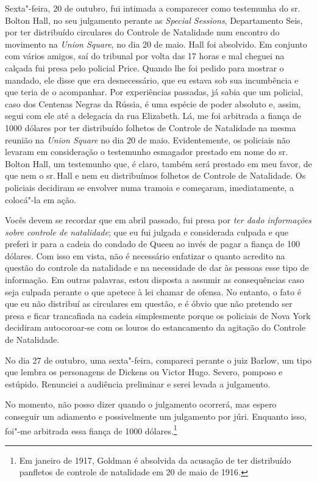 Sexta"-feira, 20 de outubro, fui intimada a comparecer como testemunha do
sr.\,Bolton Hall, no seu julgamento perante as \emph{Special Sessions},
Departamento Seis, por ter distribuído circulares do Controle de
Natalidade num encontro do movimento na \emph{Union Square}, no dia 20
de maio. Hall foi absolvido. Em conjunto com vários amigos, saí do
tribunal por volta das 17 horas e mal cheguei na calçada fui presa pelo
policial Price. Quando lhe foi pedido para mostrar o mandado, ele disse
que era desnecessário, que eu estava sob sua incumbência e que teria de
o acompanhar. Por experiências passadas, já sabia que um policial, caso
dos Centenas Negras da Rússia, é uma espécie de poder absoluto e, assim,
segui com ele até a delegacia da rua Elizabeth. Lá, me foi arbitrada a
fiança de 1000 dólares por ter distribuído folhetos de Controle de
Natalidade na mesma reunião na \emph{Union Square} no dia 20 de maio.
Evidentemente, os policiais não levaram em consideração o testemunho
esmagador prestado em nome do sr.\,Bolton Hall, um testemunho que, é
claro, também será prestado em meu favor, de que nem o sr.\,Hall e nem eu
distribuímos folhetos de Controle de Natalidade. Os policiais decidiram
se envolver numa tramoia e começaram, imediatamente, a colocá"-la em
ação.

Vocês devem se recordar que em abril passado, fui presa por \emph{ter
dado informações sobre controle de natalidade}; que eu fui julgada e
considerada culpada e que preferi ir para a cadeia do condado de Queen
ao invés de pagar a fiança de 100 dólares. Com isso em vista, não é
necessário enfatizar o quanto acredito na questão do controle da
natalidade e na necessidade de dar às pessoas esse tipo de informação.
Em outras palavras, estou disposta a assumir as consequências caso seja
culpada perante o que apetece à lei chamar de ofensa. No entanto, o fato
é que eu não distribuí as circulares em questão, e é óbvio que não
pretendo ser presa e ficar trancafiada na cadeia simplesmente porque os
policiais de Nova York decidiram autocoroar-se com os louros do estancamento
da agitação do Controle de Natalidade.


No dia 27 de outubro, uma sexta"-feira, compareci perante o juiz Barlow,
um tipo que lembra os personagens de Dickens ou Victor Hugo. Severo,
pomposo e estúpido. Renunciei a audiência preliminar e serei levada a
julgamento.

No momento, não posso dizer quando o julgamento ocorrerá, mas espero
conseguir um adiamento e possivelmente um julgamento por júri. Enquanto
isso, foi"-me arbitrada essa fiança de 1000 dólares.\footnote{Em janeiro de
  1917, Goldman é absolvida da acusação de ter distribuído panfletos de
  controle de natalidade em 20 de maio de 1916\emph{.}}

